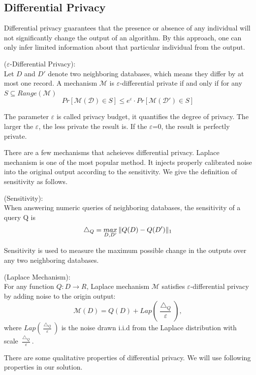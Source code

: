 \documentclass[conference]{IEEEtran}
\begin{document}
\subsection{Differential Privacy}%
Differential privacy guarantees that the presence or absence of any individual will not significantly change the output of an algorithm.
By this approach, one can only infer limited information about that particular individual from the output.

\begin{definition}{($\varepsilon$-Differential Privacy):}\\
Let $D$ and $D'$ denote two neighboring databases, which means they differ by at most one record.
A mechanism $\mathcal{M}$ is $\varepsilon$-differential private if and only if for any $S \subseteq Range(\mathcal{M})$
\begin{equation}
Pr[\mathcal{M(D)}\in S] \leq e^\varepsilon \cdot Pr[\mathcal{M(D')}\in S]
\end{equation}
\end{definition}
The parameter $\varepsilon$ is called privacy budget, it quantifies the degree of privacy.
The larger the $\varepsilon$, the less private the result is. If the $\varepsilon$=0, the result is perfectly private. 

There are a few mechanisms that acheieves differential privacy.
Laplace mechanism is one of the most popular method. 
It injects properly calibrated noise into the original output according to the sensitivity.
We give the definition of sensitivity as follows.

\begin{definition}{(Sensitivity):}\\
When answering numeric queries of neighboring databases, the sensitivity of a query Q is 
\begin{equation}
\bigtriangleup_Q=\mathop{max}\limits_{D,D'}\Arrowvert Q(D)-Q(D') \Arrowvert_1
\end{equation}
\end{definition}
Sensitivity is used to measure the maximum possible change in the outputs over any two neighboring databases.

\begin{definition}{(Laplace Mechanism):}\\
For any function $Q:D\rightarrow R$, Laplace mechanism $\mathcal{M}$ satisfies $\varepsilon$-differential privacy by adding noise to the origin output:
\begin{equation}
    \mathcal{M}(D) = Q(D)+Lap(\frac{\bigtriangleup_Q}{\varepsilon}),
\end{equation}
where $Lap(\frac{\bigtriangleup_Q}{\varepsilon})$ is the noise drawn i.i.d from the Laplace distribution with scale $\frac{\bigtriangleup_Q}{\varepsilon}$.
\end{definition}
There are some qualitative properties of differential privacy. We will use following properties in our solution. 
\end{document}
